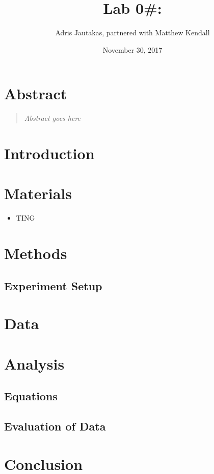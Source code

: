 \documentclass[12pt]{article}
\title{Lab 0#: }
\author{Adris Jautakas, partnered with Matthew Kendall}
\date{November 30, 2017}
\begin{document}
   \maketitle

    \section*{Abstract}
        \begin{quote}
        {\textit {\small 
            Abstract goes here
        } }
        \end{quote}

    \section{Introduction}

    \section{Materials}
        \begin{itemize}
            \item TING
        \end{itemize}
    
    \section{Methods}
        \subsection{Experiment Setup}
    
    \section{Data}
    
    \section{Analysis}
        \subsection{Equations}
        \subsection{Evaluation of Data}
    
    \section{Conclusion}
        
\end{document}
